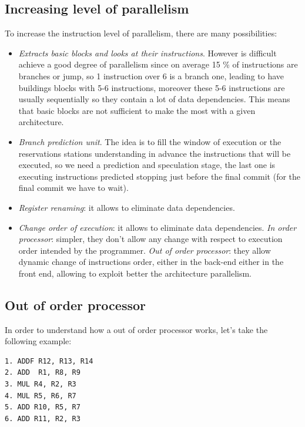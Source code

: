 \subsection{Increasing level of parallelism}
To increase the instruction level of parallelism, there are many possibilities:

\begin{itemize}
  \item \textit{Extracts basic blocks and looks at their instructions}. However is difficult achieve a good degree of parallelism since on average 15 \% of instructions are branches or jump, so 1 instruction over 6 is a branch one, leading to have buildings blocks with 5-6 instructions, moreover these 5-6 instructions are usually sequentially so they contain a lot of data dependencies. This means that basic blocks are not sufficient to make the most with a given architecture.

  \item \textit{Branch prediction unit}. The idea is to fill the window of execution or the reservations stations understanding in advance the instructions that will be executed, so we need a prediction and speculation stage, the last one is executing instructions predicted stopping just before the final commit (for the final commit we have to wait).

  \item \textit{Register renaming}: it allows to eliminate data dependencies.

  \item \textit{Change order of execution}: it allows to eliminate data dependencies.
    \subitem \textit{In order processor}: simpler, they don't allow any change with respect to execution order intended by the programmer.
    \subitem \textit{Out of order processor}: they allow dynamic change of instructions order, either in the back-end either in the front end, allowing to exploit better the architecture parallelism.
\end{itemize}

\subsection{Out of order processor}
In order to understand how a out of order processor works, let's take the following example:

\begin{verbatim}
1. ADDF R12, R13, R14
2. ADD  R1, R8, R9
3. MUL R4, R2, R3
4. MUL R5, R6, R7
5. ADD R10, R5, R7
6. ADD R11, R2, R3
\end{verbatim}


